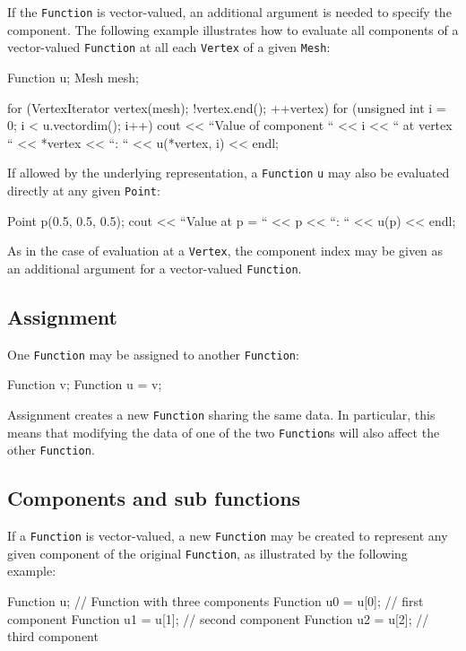 If the \texttt{Function} is vector-valued, an additional argument is
needed to specify the component.  The following example illustrates
how to evaluate all components of a vector-valued \texttt{Function}
at all each \texttt{Vertex} of a given \texttt{Mesh}:
\begin{code}
Function u;
Mesh mesh;

for (VertexIterator vertex(mesh); !vertex.end(); ++vertex)
  for (unsigned int i = 0; i < u.vectordim(); i++)
    cout << ``Value of component `` << i << `` at vertex ``
         << *vertex << ``: `` << u(*vertex, i) << endl;
\end{code}

If allowed by the underlying representation, a \texttt{Function}
\texttt{u} may also be evaluated directly at any given \texttt{Point}:
\begin{code}
Point p(0.5, 0.5, 0.5);
cout << ``Value at p = `` << p << ``: `` << u(p) << endl;
\end{code}
As in the case of evaluation at a \texttt{Vertex}, the component index
may be given as an additional argument for a vector-valued \texttt{Function}.

\subsection{Assignment}

One \texttt{Function} may be assigned to another \texttt{Function}:
\begin{code}
Function v;
Function u = v;
\end{code}
Assignment creates a new \texttt{Function} sharing the same data.  In
particular, this means that modifying the data of one of the two
\texttt{Function}s will also affect the other \texttt{Function}.

\subsection{Components and sub functions}

If a \texttt{Function} is vector-valued, a new \texttt{Function} may be
created to represent any given component of the original \texttt{Function},
as illustrated by the following example:
\begin{code}
Function u;         // Function with three components
Function u0 = u[0]; // first component
Function u1 = u[1]; // second component
Function u2 = u[2]; // third component
\end{code}

